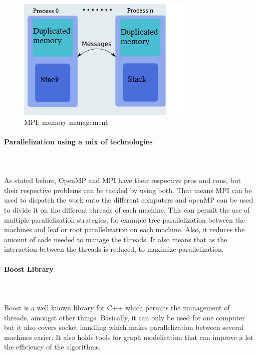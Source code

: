 \begin{figure}[!h] 
\centerline{\includegraphics[scale=0.85]{5Solutions_and_schedule/5.1MultithreadingMP_boost_Visual_MPI_5000_Zotero_Project_Baptiste/MPI}}
   \caption{\label{étiquette} MPI: memory management}
\label{fig:MPI}
\end{figure}

\paragraph{Parallelization using a mix of technologies} \label{sec:hybrid}\mbox{}\\\mbox{}\\

As stated before, OpenMP and MPI have their respective pros and cons, but their respective problems can be tackled by using both. That means MPI can be used to dispatch the work onto the different computers and openMP can be used to divide it on the different threads of each machine. This can permit the use of multiple parallelization strategies, for example tree parallelization between the machines and leaf or root parallelization on each machine. Also, it reduces the amount of code needed to manage the threads. It also means that as the interaction between the threads is reduced, to maximize parallelization.

\paragraph{Boost Library}\mbox{}\\\mbox{}\\

Boost is a well known library for C++ which permits the management of threads, amongst other things. Basically, it can only be used for one computer but it also covers socket handling which makes parallelization between several machines easier. It also holds tools for graph modelisation that can improve a lot the efficiency of the algorithms.


